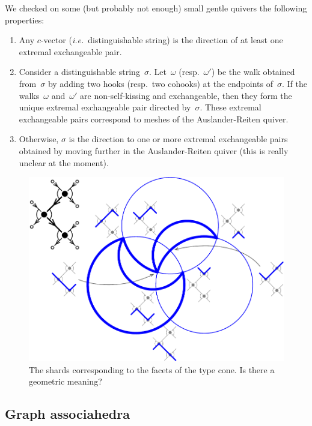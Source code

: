 \documentclass{amsart}
\theoremstyle{definition}
\newcommand{\ie}{\textit{i.e.}~} %
\begin{document}
We checked on some (but probably not enough) small gentle quivers the following properties:
\begin{enumerate}
\item Any $c$-vector (\ie distinguishable string) is the direction of at least one extremal exchangeable pair.
\item Consider a distinguishable string~$\sigma$. Let~$\omega$ (resp.~$\omega'$) be the walk obtained from~$\sigma$ by adding two hooks (resp.~two cohooks) at the endpoints of~$\sigma$. If the walks~$\omega$ and~$\omega'$ are non-self-kissing and exchangeable, then they form the unique extremal exchangeable pair directed by~$\sigma$. These extremal exchangeable pairs correspond to meshes of the Auslander-Reiten quiver.
\item Otherwise, $\sigma$ is the direction to one or more extremal exchangeable pairs obtained by moving further in the Auslander-Reiten quiver (this is really unclear at the moment).
\end{enumerate}

\begin{figure}[t]
	\capstart
	\centerline{\includegraphics[scale=.6]{fan}}
	\caption{The shards corresponding to the facets of the type cone. Is there a geometric meaning?}
	\label{fig:fanShards}
\end{figure}


\subsection{Graph associahedra}
\end{document}
